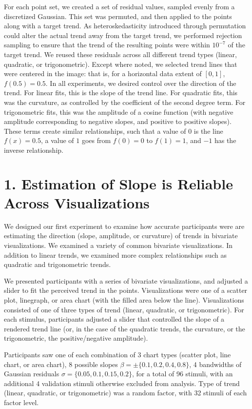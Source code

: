 \documentclass{sigchi}
\begin{document}
For each point set, we created a set of residual values, sampled evenly from a discretized Gaussian. This set was permuted, and then applied to the points along with a target trend. As heteroskedasticity introduced through permutation could alter the actual trend away from the target trend, we performed rejection sampling to ensure that the trend of the resulting points were within $10^{-7}$ of the target trend. We reused these residuals across all different trend types (linear, quadratic, or trigonometric). Except where noted, we selected trend lines that were centered in the image: that is, for a horizontal data extent of $[0,1]$, $f(0.5) = 0.5$. In all experiments, we desired control over the direction of the trend. For linear fits, this is the slope of the trend line. For quadratic fits, this was the curvature, as controlled by the coefficient of the second degree term. For trigonometric fits, this was the amplitude of a cosine function (with negative amplitude corresponding to negative slopes, and positive to positive slopes). These terms create similar relationships, such that a value of $0$ is the line $f(x)=0.5$, a value of $1$ goes from $f(0)=0$ to $f(1)=1$, and $-1$ has the inverse relationship.


\section{1. Estimation of Slope is Reliable \\ Across Visualizations}

We designed our first experiment to examine how accurate participants were are estimating the direction (slope, amplitude, or curvature) of trends in bivariate visualizations. We examined a variety of common bivariate visualizations. In addition to linear trends, we examined more complex relationships such as quadratic and trigonometric trends.

We presented participants with a series of bivariate visualizations, and adjusted a slider to fit the perceived trend in the points. Visualizations were one of a scatter plot, linegraph, or area chart (with the filled area below the line). Visualizations consisted of one of three types of trend (linear, quadratic, or trigonometric). For each stimulus, participants adjusted a slider that controlled the slope of a rendered trend line (or, in the case of the quadratic trends, the curvature, or the trigonometric, the positive/negative amplitude).

Participants saw one of each combination of 3 chart types (scatter plot, line chart, or area chart), 8 possible slopes $\beta = \pm \{0.1,0.2,0.4,0.8\}$, 4 bandwidths of Gaussian residuals $\sigma = \{0.05,0.1,0.15,0.2\}$, for a total of 96 stimuli, with an additional 4 validation stimuli otherwise excluded from analysis. Type of trend (linear, quadratic, or trigonometric) was a random factor, with 32 stimuli of each factor level.
\end{document}
